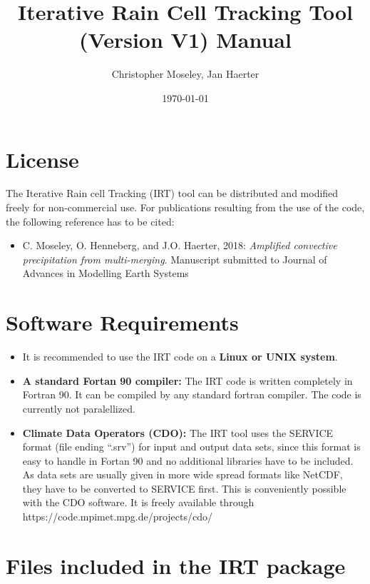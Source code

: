 \documentclass[11pt]{article}
\begin{document}
\title{Iterative Rain Cell Tracking Tool (Version V1) Manual}
\author{Christopher Moseley, Jan Haerter}
\date{\today}
\maketitle

\section{License}

The Iterative Rain cell Tracking (IRT) tool can be distributed and modified freely for non-commercial use. For publications resulting from the use of the code, the following reference has to be cited:
\begin{itemize}
\item C. Moseley, O. Henneberg, and J.O. Haerter, 2018: {\it Amplified convective precipitation from multi-merging}. Manuscript submitted to Journal of Advances in Modelling Earth Systems
\end{itemize}

\section{Software Requirements}

\begin{itemize}
\item It is recommended to use the IRT code on a {\bf Linux or UNIX system}.
\item {\bf A standard Fortan 90 compiler:} The IRT code is written completely in Fortran 90. It can be compiled by any standard fortran compiler. The code is currently not paralellized.
\item {\bf Climate Data Operators (CDO):} The IRT tool uses the SERVICE format (file ending ``.srv'') for input and output data sets, since this format is easy to handle in Fortan 90 and no additional libraries have to be included. As data sets are usually given in more wide spread formats like NetCDF, they have to be converted to SERVICE first. This is conveniently possible with the CDO software. It is freely available through  https://code.mpimet.mpg.de/projects/cdo/
\end{itemize}

\section{Files included in the IRT package}
\end{document}
